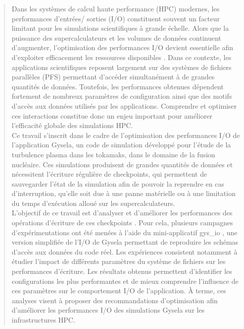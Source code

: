 \documentclass[systeme]{compas2026}
\begin{document}
\begin{abstract}
Dans les systèmes de calcul haute performance (HPC) modernes, les performances d’entrées/ sorties (I/O) constituent souvent un facteur limitant pour les simulations scientifiques à grande échelle. Alors que la puissance des supercalculateurs et les volumes de données continuent d’augmenter, l’optimisation des performances I/O devient essentielle afin d’exploiter efficacement les ressources disponibles \cite{boito2025hdr}.
Dans ce contexte, les applications scientifiques reposent largement sur des systèmes de fichiers parallèles (PFS) permettant d’accéder simultanément à de grandes quantités de données. Toutefois, les performances obtenues dépendent fortement de nombreux paramètres de configuration ainsi que des motifs d’accès aux données utilisés par les applications. Comprendre et optimiser ces interactions constitue donc un enjeu important pour améliorer l’efficacité globale des simulations HPC.\\
Ce travail s’inscrit dans le cadre de l’optimisation des performances I/O de l’application Gysela, un code de simulation développé pour l’étude de la turbulence plasma dans les tokamaks, dans le domaine de la fusion nucléaire. Ces simulations produisent de grandes quantités de données et nécessitent l’écriture régulière de checkpoints, qui permettent de sauvegarder l’état de la simulation afin de pouvoir la reprendre en cas d’interruption, qu’elle soit due à une panne matérielle ou à une limitation du temps d’exécution alloué sur les supercalculateurs.\\
L’objectif de ce travail est d’analyser et d’améliorer les performances des opérations d’écriture de ces checkpoints \cite{trochon2025checkpointing}. Pour cela, plusieurs campagnes d’expérimentations ont été menées à l’aide du mini-applicatif gys\_io \cite{gysela_miniapp_io}, une version simplifiée de l’I/O de Gysela permettant de reproduire les schémas d’accès aux données du code réel.
Les expériences consistent notamment à étudier l’impact de différents paramètres du système de fichiers sur les performances d’écriture. Les résultats obtenus permettent d’identifier les configurations les plus performantes et de mieux comprendre l’influence de ces paramètres sur le comportement I/O de l’application. À terme, ces analyses visent à proposer des recommandations d’optimisation afin d’améliorer les performances I/O des simulations Gysela sur les infrastructures HPC.\\
\end{abstract}


\end{document}
